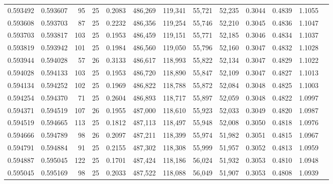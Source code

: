 \begin{tabular}{rrrrrrrrrrrrr}
0.593492 & 0.593607 &    95 &  25 &                                     0.2083 & 486,269 & 119,341 &  55,721 &  52,235 & 0.3044 & 0.4839 & 1.1055 \\
0.593608 & 0.593703 &    87 &  25 &                                     0.2232 & 486,356 & 119,254 &  55,746 &  52,210 & 0.3045 & 0.4836 & 1.1047 \\
0.593703 & 0.593817 &   103 &  25 &                                     0.1953 & 486,459 & 119,151 &  55,771 &  52,185 & 0.3046 & 0.4834 & 1.1037 \\
0.593819 & 0.593942 &   101 &  25 &                                     0.1984 & 486,560 & 119,050 &  55,796 &  52,160 & 0.3047 & 0.4832 & 1.1028 \\
0.593944 & 0.594028 &    57 &  26 &                                     0.3133 & 486,617 & 118,993 &  55,822 &  52,134 & 0.3047 & 0.4829 & 1.1022 \\
0.594028 & 0.594133 &   103 &  25 &                                     0.1953 & 486,720 & 118,890 &  55,847 &  52,109 & 0.3047 & 0.4827 & 1.1013 \\
0.594134 & 0.594252 &   102 &  25 &                                     0.1969 & 486,822 & 118,788 &  55,872 &  52,084 & 0.3048 & 0.4825 & 1.1003 \\
0.594254 & 0.594370 &    71 &  25 &                                     0.2604 & 486,893 & 118,717 &  55,897 &  52,059 & 0.3048 & 0.4822 & 1.0997 \\
0.594371 & 0.594519 &   107 &  26 &                                     0.1955 & 487,000 & 118,610 &  55,923 &  52,033 & 0.3049 & 0.4820 & 1.0987 \\
0.594519 & 0.594665 &   113 &  25 &                                     0.1812 & 487,113 & 118,497 &  55,948 &  52,008 & 0.3050 & 0.4818 & 1.0976 \\
0.594666 & 0.594789 &    98 &  26 &                                     0.2097 & 487,211 & 118,399 &  55,974 &  51,982 & 0.3051 & 0.4815 & 1.0967 \\
0.594791 & 0.594884 &    91 &  25 &                                     0.2155 & 487,302 & 118,308 &  55,999 &  51,957 & 0.3052 & 0.4813 & 1.0959 \\
0.594887 & 0.595045 &   122 &  25 &                                     0.1701 & 487,424 & 118,186 &  56,024 &  51,932 & 0.3053 & 0.4810 & 1.0948 \\
0.595045 & 0.595169 &    98 &  25 &                                     0.2033 & 487,522 & 118,088 &  56,049 &  51,907 & 0.3053 & 0.4808 & 1.0939 \\

\end{tabular}
